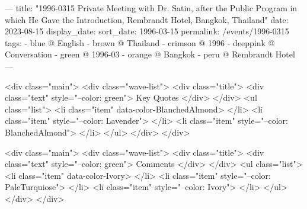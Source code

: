 ---
title: "1996-0315 Private Meeting with Dr. Satin, after the Public Program in which He Gave the Introduction, Rembrandt Hotel, Bangkok, Thailand"
date: 2023-08-15
display_date: 
sort_date: 1996-03-15
permalink: /events/1996-0315
tags:
  - blue @ English
  - brown @ Thailand
  - crimson @ 1996
  - deeppink @ Conversation
  - green @ 1996-03 
  - orange @ Bangkok
  - peru @ Rembrandt Hotel
---

<div class="main">
  <div class="wave-list">
    <div class="title">
      <div class="text" style="--color: green">
        Key Quotes
      </div>
    </div>
    <ul class="list">
        <li class="item" data-color-BlanchedAlmond>
        </li>
        <li class="item" style="--color: Lavender">
        </li>
        <li class="item" style="--color: BlanchedAlmond">
        </li>
      </ul>
  </div>
</div>

<div class="main">
  <div class="wave-list">
    <div class="title">
      <div class="text" style="--color: green">
        Comments
      </div>
    </div>
    <ul class="list">
        <li class="item" data-color-Ivory>
        </li>
        <li class="item" style="--color: PaleTurquiose">
        </li>
        <li class="item" style="--color: Ivory">
        </li>
      </ul>
  </div>
</div>